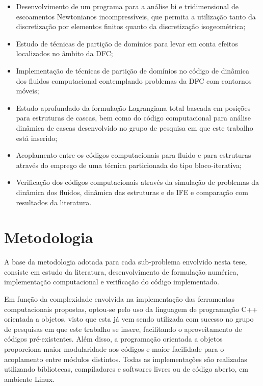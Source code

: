 \documentclass[tese_patricia.tex]{subfiles}
\begin{document}
\begin{itemize}
	\item Desenvolvimento de um programa para a análise bi e tridimensional de escoamentos Newtonianos incompressíveis, que permita a utilização tanto da discretização por elementos finitos quanto da discretização isogeométrica;

	\item Estudo de técnicas de partição de domínios para levar em conta efeitos localizados no âmbito da DFC;
	
	\item Implementação de técnicas de partição de domínios no código de dinâmica dos fluidos computacional contemplando problemas da DFC com contornos móveis;
	
	\item Estudo aprofundado da formulação Lagrangiana total baseada em posições para estruturas de cascas, bem como do código computacional para análise dinâmica de cascas desenvolvido no grupo de pesquisa em que este trabalho está inserido;
	
	\item Acoplamento entre os códigos computacionais para fluido e para estruturas através do emprego de uma técnica particionada do tipo bloco-iterativa;
	
	\item  Verificação dos códigos computacionais através da simulação de problemas da dinâmica dos fluidos, dinâmica das estruturas e de IFE e comparação com resultados da literatura.
	
\end{itemize}

\section[Metodologia]{Metodologia} 
A base da metodologia adotada para cada sub-problema envolvido nesta tese, consiste em estudo da literatura, desenvolvimento de formulação numérica, implementação computacional e verificação do código implementado.

Em função da complexidade envolvida na implementação das ferramentas computacionais propostas, optou-se pelo uso da linguagem de programação C++ orientada a objetos, visto que esta já vem sendo utilizada com sucesso no grupo de pesquisas em que este trabalho se insere, facilitando o aproveitamento de códigos pré-existentes. Além disso, a programação orientada a objetos proporciona maior modularidade aos códigos e maior facilidade para o acoplamento entre módulos distintos. Todas as implementações são realizadas utilizando bibliotecas, compiladores e softwares livres ou de código aberto, em ambiente Linux.
\end{document}
